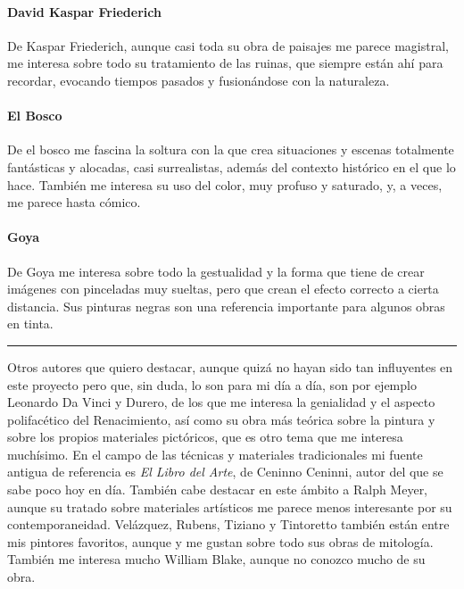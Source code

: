 \hypertarget{david-kaspar-friederich}{%
\paragraph{David Kaspar Friederich}\label{david-kaspar-friederich}}

De Kaspar Friederich, aunque casi toda su obra de paisajes me parece
magistral, me interesa sobre todo su tratamiento de las ruinas, que
siempre están ahí para recordar, evocando tiempos pasados y fusionándose
con la naturaleza.

\hypertarget{el-bosco}{%
\paragraph{El Bosco}\label{el-bosco}}

De el bosco me fascina la soltura con la que crea situaciones y escenas
totalmente fantásticas y alocadas, casi surrealistas, además del
contexto histórico en el que lo hace. También me interesa su uso del
color, muy profuso y saturado, y, a veces, me parece hasta cómico.

\hypertarget{goya}{%
\paragraph{Goya}\label{goya}}

De Goya me interesa sobre todo la gestualidad y la forma que tiene de
crear imágenes con pinceladas muy sueltas, pero que crean el efecto
correcto a cierta distancia. Sus pinturas negras son una referencia
importante para algunos obras en tinta.

\begin{center}\rule{0.5\linewidth}{0.5pt}\end{center}

Otros autores que quiero destacar, aunque quizá no hayan sido tan
influyentes en este proyecto pero que, sin duda, lo son para mi día a
día, son por ejemplo Leonardo Da Vinci y Durero, de los que me interesa
la genialidad y el aspecto polifacético del Renacimiento, así como su
obra más teórica sobre la pintura y sobre los propios materiales
pictóricos, que es otro tema que me interesa muchísimo. En el campo de
las técnicas y materiales tradicionales mi fuente antigua de referencia
es \emph{El Libro del Arte}, de Ceninno Ceninni, autor del que se sabe
poco hoy en día. También cabe destacar en este ámbito a Ralph Meyer,
aunque su tratado sobre materiales artísticos me parece menos
interesante por su contemporaneidad. Velázquez, Rubens, Tiziano y
Tintoretto también están entre mis pintores favoritos, aunque y me
gustan sobre todo sus obras de mitología. También me interesa mucho
William Blake, aunque no conozco mucho de su obra.

